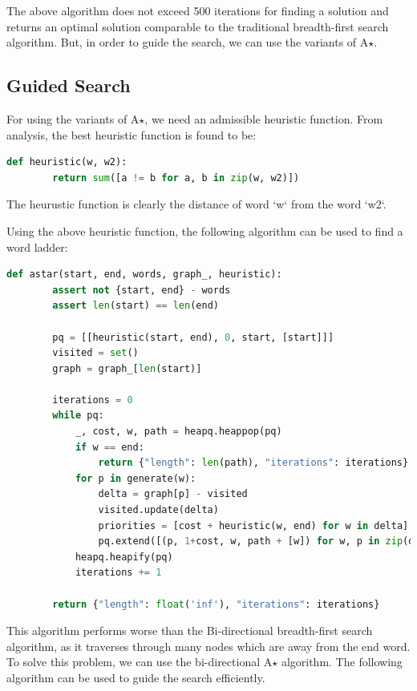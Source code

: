 \documentclass[]{article}
\begin{document}
The above algorithm does not exceed 500 iterations for finding a solution and returns an optimal solution comparable to the traditional breadth-first search algorithm. But, in order to guide the search, we can use the variants of A$\star$.

\subsection{Guided Search}

For using the variants of A$\star$, we need an admissible heuristic function. From analysis, the best heuristic function is found to be:

\begin{lstlisting}[language=Python]
	def heuristic(w, w2):
		return sum([a != b for a, b in zip(w, w2)])
\end{lstlisting}

The heurustic function is clearly the distance of word `w` from the word `w2`.

Using the above heuristic function, the following algorithm can be used to find a word ladder:

\begin{lstlisting}[language=Python]
	def astar(start, end, words, graph_, heuristic):
		assert not {start, end} - words
		assert len(start) == len(end)
		
		pq = [[heuristic(start, end), 0, start, [start]]]
		visited = set()
		graph = graph_[len(start)]
		
		iterations = 0
		while pq:
			_, cost, w, path = heapq.heappop(pq)
			if w == end: 
				return {"length": len(path), "iterations": iterations}
			for p in generate(w):
				delta = graph[p] - visited
				visited.update(delta)
				priorities = [cost + heuristic(w, end) for w in delta]
				pq.extend([(p, 1+cost, w, path + [w]) for w, p in zip(delta, priorities)])
			heapq.heapify(pq)
			iterations += 1
			
		return {"length": float('inf'), "iterations": iterations}	
\end{lstlisting}

This algorithm performs worse than the Bi-directional breadth-first search algorithm, as it traverses through many nodes which are away from the end word. To solve this problem, we can use the bi-directional A$\star$ algorithm. The following algorithm can be used to guide the search efficiently.
\end{document}
